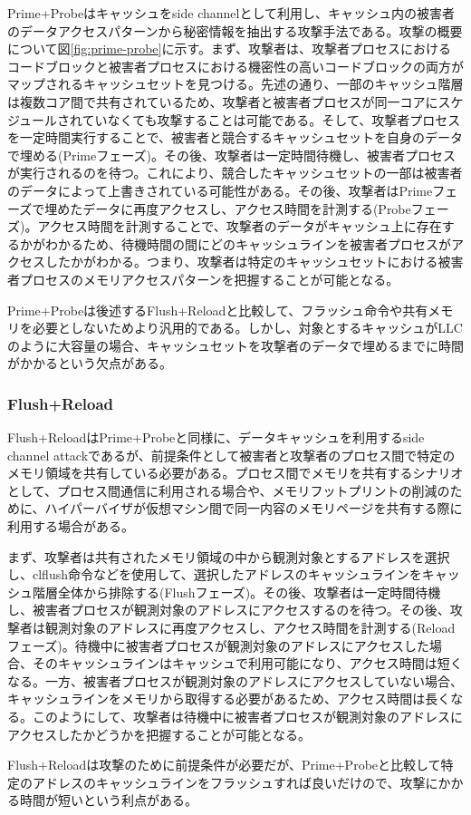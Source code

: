 Prime+Probe\cite{tromer2010efficient}はキャッシュをside channelとして利用し、キャッシュ内の被害者のデータアクセスパターンから秘密情報を抽出する攻撃手法である。攻撃の概要について図\ref{fig:prime-probe}に示す。まず、攻撃者は、攻撃者プロセスにおけるコードブロックと被害者プロセスにおける機密性の高いコードブロックの両方がマップされるキャッシュセットを見つける。先述の通り、一部のキャッシュ階層は複数コア間で共有されているため、攻撃者と被害者プロセスが同一コアにスケジュールされていなくても攻撃することは可能である\cite{liu2015last}。そして、攻撃者プロセスを一定時間実行することで、被害者と競合するキャッシュセットを自身のデータで埋める(Primeフェーズ)。その後、攻撃者は一定時間待機し、被害者プロセスが実行されるのを待つ。これにより、競合したキャッシュセットの一部は被害者のデータによって上書きされている可能性がある。その後、攻撃者はPrimeフェーズで埋めたデータに再度アクセスし、アクセス時間を計測する(Probeフェーズ)。アクセス時間を計測することで、攻撃者のデータがキャッシュ上に存在するかがわかるため、待機時間の間にどのキャッシュラインを被害者プロセスがアクセスしたかがわかる。つまり、攻撃者は特定のキャッシュセットにおける被害者プロセスのメモリアクセスパターンを把握することが可能となる。\par
Prime+Probeは後述するFlush+Reloadと比較して、フラッシュ命令や共有メモリを必要としないためより汎用的である。しかし、対象とするキャッシュがLLCのように大容量の場合、キャッシュセットを攻撃者のデータで埋めるまでに時間がかかるという欠点がある。

\subsubsection{Flush+Reload}
Flush+Reload\cite{yarom2014flush+}はPrime+Probeと同様に、データキャッシュを利用するside channel attackであるが、前提条件として被害者と攻撃者のプロセス間で特定のメモリ領域を共有している必要がある。プロセス間でメモリを共有するシナリオとして、プロセス間通信に利用される場合や、メモリフットプリントの削減のために、ハイパーバイザが仮想マシン間で同一内容のメモリページを共有する際に利用する場合がある\cite{yarom2014flush+}。\par
まず、攻撃者は共有されたメモリ領域の中から観測対象とするアドレスを選択し、clflush命令などを使用して、選択したアドレスのキャッシュラインをキャッシュ階層全体から排除する(Flushフェーズ)。その後、攻撃者は一定時間待機し、被害者プロセスが観測対象のアドレスにアクセスするのを待つ。その後、攻撃者は観測対象のアドレスに再度アクセスし、アクセス時間を計測する(Reloadフェーズ)。待機中に被害者プロセスが観測対象のアドレスにアクセスした場合、そのキャッシュラインはキャッシュで利用可能になり、アクセス時間は短くなる。一方、被害者プロセスが観測対象のアドレスにアクセスしていない場合、キャッシュラインをメモリから取得する必要があるため、アクセス時間は長くなる。このようにして、攻撃者は待機中に被害者プロセスが観測対象のアドレスにアクセスしたかどうかを把握することが可能となる。\par
Flush+Reloadは攻撃のために前提条件が必要だが、Prime+Probeと比較して特定のアドレスのキャッシュラインをフラッシュすれば良いだけので、攻撃にかかる時間が短いという利点がある。

